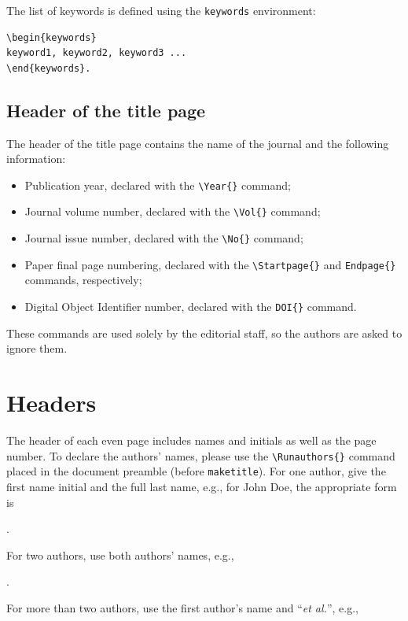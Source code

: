 \documentclass{amcs}
\begin{document}
\noindent The list of keywords is defined using the \verb+keywords+ environment:

{\small \begin{verbatim}
\begin{keywords}
keyword1, keyword2, keyword3 ...
\end{keywords}.
\end{verbatim}}

\subsection{Header of the title page}
The header of the title page contains the name of the journal and the following information:
\begin{itemize}
  \item
    Publication year, declared with the \verb+\Year{}+ command;
  \item
    Journal volume number, declared with the \verb+\Vol{}+ command;
  \item
    Journal issue number, declared with the \verb+\No{}+ command;
  \item
    Paper final page numbering, declared with the \verb+\Startpage{}+ and \verb+Endpage{}+ commands, respectively;
  \item
    Digital Object Identifier number, declared with the \verb+DOI{}+ command.
\end{itemize}
These commands are used solely by the editorial staff, so the authors are asked to ignore them.

\section{Headers}
The header of each even page includes names and initials as well as the page number. To declare the authors' names, please use the \verb+\Runauthors{}+ command placed in the document preamble (before \verb+maketitle+). For one author, give the first name initial and the full last name, e.g., for John Doe, the appropriate form is

\medskip{}.

\medskip\noindent
For two authors, use both authors' names, e.g.,

\medskip{}.

\medskip\noindent For more than two authors, use the first author's name and ``\emph{et al.}'', e.g.,
\end{document}
